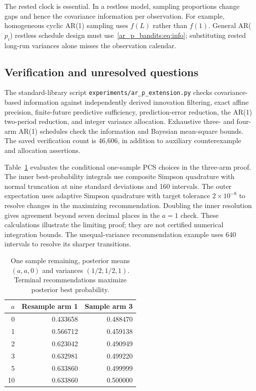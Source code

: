 The rested clock is essential. In a restless model, sampling proportions change gaps and hence the covariance information per observation. For example, homogeneous cyclic AR(1) sampling uses $f(L)$ rather than $f(1)$. General AR($p_i$) restless schedule design must use~\eqref{ar_p_bandits:eq:info}; substituting rested long-run variances alone misses the observation calendar.

\subsection{Verification and unresolved questions}
The standard-library script \texttt{experiments/ar\_p\_extension.py} checks covariance-based information against independently derived innovation filtering, exact affine precision, finite-future predictive sufficiency, prediction-error reduction, the AR(1) two-period reduction, and integer variance allocation. Exhaustive three- and four-arm AR(1) schedules check the information and Bayesian mean-square bounds. The saved verification count is 46,606, in addition to auxiliary counterexample and allocation assertions.

Table~\ref{ar_p_bandits:tab:conditional} evaluates the conditional one-sample PCS choices in the three-arm proof. The inner best-probability integrals use composite Simpson quadrature with normal truncation at nine standard deviations and 160 intervals. The outer expectation uses adaptive Simpson quadrature with target tolerance $2\times10^{-8}$ to resolve changes in the maximizing recommendation. Doubling the inner resolution gives agreement beyond seven decimal places in the $a=1$ check. These calculations illustrate the limiting proof; they are not certified numerical integration bounds. The unequal-variance recommendation example uses 640 intervals to resolve its sharper transitions.

\begin{table}[htbp]
\centering
\caption{One sample remaining, posterior means $(a,a,0)$ and variances $(1/2,1/2,1)$. Terminal recommendations maximize posterior best probability.}
\label{ar_p_bandits:tab:conditional}
\begin{tabular}{rrr}
\toprule
$a$ & Resample arm 1 & Sample arm 3\\
\midrule

0 & 0.433658 & 0.488470 \\
1 & 0.566712 & 0.459138 \\
2 & 0.623042 & 0.490949 \\
3 & 0.632981 & 0.499220 \\
5 & 0.633860 & 0.499999 \\
10 & 0.633860 & 0.500000 \\


\bottomrule
\end{tabular}
\end{table}

